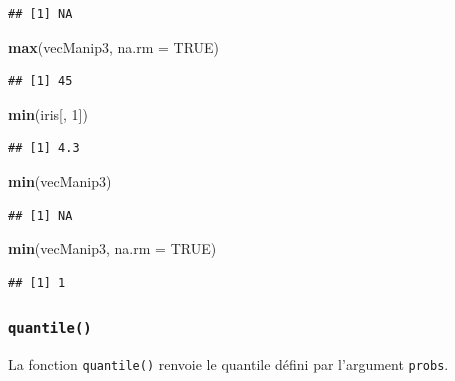 \documentclass[
]{book}
\newenvironment{Shaded}{\begin{snugshade}}{\end{snugshade}}
\newcommand{\DataTypeTok}[1]{\textcolor[rgb]{0.13,0.29,0.53}{#1}}
\newcommand{\DecValTok}[1]{\textcolor[rgb]{0.00,0.00,0.81}{#1}}
\newcommand{\KeywordTok}[1]{\textcolor[rgb]{0.13,0.29,0.53}{\textbf{#1}}}
\newcommand{\NormalTok}[1]{#1}
\newcommand{\OtherTok}[1]{\textcolor[rgb]{0.56,0.35,0.01}{#1}}
\begin{document}
\begin{verbatim}
## [1] NA
\end{verbatim}

\begin{Shaded}
\begin{Highlighting}[]
\KeywordTok{max}\NormalTok{(vecManip3, }\DataTypeTok{na.rm =} \OtherTok{TRUE}\NormalTok{)}
\end{Highlighting}
\end{Shaded}

\begin{verbatim}
## [1] 45
\end{verbatim}

\begin{Shaded}
\begin{Highlighting}[]
\KeywordTok{min}\NormalTok{(iris[, }\DecValTok{1}\NormalTok{])}
\end{Highlighting}
\end{Shaded}

\begin{verbatim}
## [1] 4.3
\end{verbatim}

\begin{Shaded}
\begin{Highlighting}[]
\KeywordTok{min}\NormalTok{(vecManip3)}
\end{Highlighting}
\end{Shaded}

\begin{verbatim}
## [1] NA
\end{verbatim}

\begin{Shaded}
\begin{Highlighting}[]
\KeywordTok{min}\NormalTok{(vecManip3, }\DataTypeTok{na.rm =} \OtherTok{TRUE}\NormalTok{)}
\end{Highlighting}
\end{Shaded}

\begin{verbatim}
## [1] 1
\end{verbatim}

\hypertarget{l015quantile}{%
\subsubsection{\texorpdfstring{\texttt{quantile()}}{quantile()}}\label{l015quantile}}

La fonction \texttt{quantile()} renvoie le quantile défini par l'argument \texttt{probs}.
\end{document}
